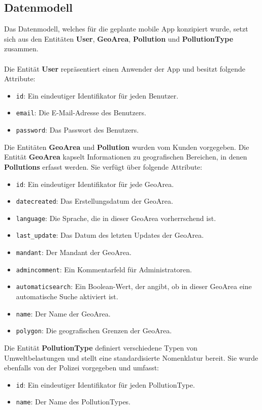 \documentclass[a4paper,12pt]{article}
\begin{document}
\subsection{Datenmodell}
Das Datenmodell, welches für die geplante mobile App konzipiert wurde, setzt sich aus den Entitäten \textbf{User}, \textbf{GeoArea}, \textbf{Pollution} und \textbf{PollutionType} zusammen.\\
\\
Die Entität \textbf{User} repräsentiert einen Anwender der App und besitzt folgende Attribute:
\begin{itemize}
    \item \texttt{id}: Ein eindeutiger Identifikator für jeden Benutzer.
    \item \texttt{email}: Die E-Mail-Adresse des Benutzers.
    \item \texttt{password}: Das Passwort des Benutzers.
\end{itemize}
Die Entitäten \textbf{GeoArea} und \textbf{Pollution} wurden vom Kunden vorgegeben. Die Entität \textbf{GeoArea} kapselt Informationen zu geografischen Bereichen, in denen \textbf{Pollutions} erfasst werden. Sie verfügt über folgende Attribute:
\begin{itemize}
    \item \texttt{id}: Ein eindeutiger Identifikator für jede GeoArea.
    \item \texttt{datecreated}: Das Erstellungsdatum der GeoArea.
    \item \texttt{language}: Die Sprache, die in dieser GeoArea vorherrschend ist.
    \item \texttt{last\_update}: Das Datum des letzten Updates der GeoArea.
    \item \texttt{mandant}: Der Mandant der GeoArea.
    \item \texttt{admincomment}: Ein Kommentarfeld für Administratoren.
    \item \texttt{automaticsearch}: Ein Boolean-Wert, der angibt, ob in dieser GeoArea eine automatische Suche aktiviert ist.
    \item \texttt{name}: Der Name der GeoArea.
    \item \texttt{polygon}: Die geografischen Grenzen der GeoArea.
\end{itemize}
Die Entität \textbf{PollutionType} definiert verschiedene Typen von Umweltbelastungen und stellt eine standardisierte Nomenklatur bereit. Sie wurde ebenfalls von der Polizei vorgegeben und umfasst:
\begin{itemize}
    \item \texttt{id}: Ein eindeutiger Identifikator für jeden PollutionType.
    \item \texttt{name}: Der Name des PollutionTypes.
\end{itemize}
\end{document}
